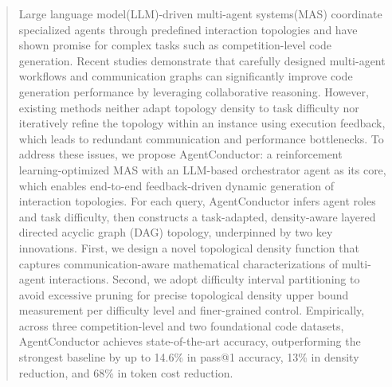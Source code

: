 \documentclass{article}
\theoremstyle{definition}
\begin{document}
\begin{abstract}
  Large language model(LLM)-driven multi-agent systems(MAS) coordinate specialized agents through predefined interaction topologies and have shown promise for complex tasks such as competition-level code generation. Recent studies demonstrate that carefully designed multi-agent workflows and communication graphs can significantly improve code generation performance by leveraging collaborative reasoning. However, existing methods neither adapt topology density to task difficulty nor iteratively refine the topology within an instance using execution feedback, which leads to redundant communication and performance bottlenecks. To address these issues, we propose AgentConductor: a reinforcement learning-optimized MAS with an LLM-based orchestrator agent as its core, which enables end-to-end feedback-driven dynamic generation of interaction topologies. For each query, AgentConductor infers agent roles and task difficulty, then constructs a task-adapted, density-aware layered directed acyclic graph (DAG) topology, underpinned by two key innovations. First, we design a novel topological density function that captures communication-aware mathematical characterizations of multi-agent interactions. Second, we adopt difficulty interval partitioning to avoid excessive pruning for precise topological density upper bound measurement per difficulty level and finer-grained control. Empirically, across three competition-level and two foundational code datasets, AgentConductor achieves state-of-the-art accuracy, outperforming the strongest baseline by up to 14.6\% in pass@1 accuracy, 13\% in density reduction, and 68\% in token cost reduction.
\end{abstract}
\end{document}

